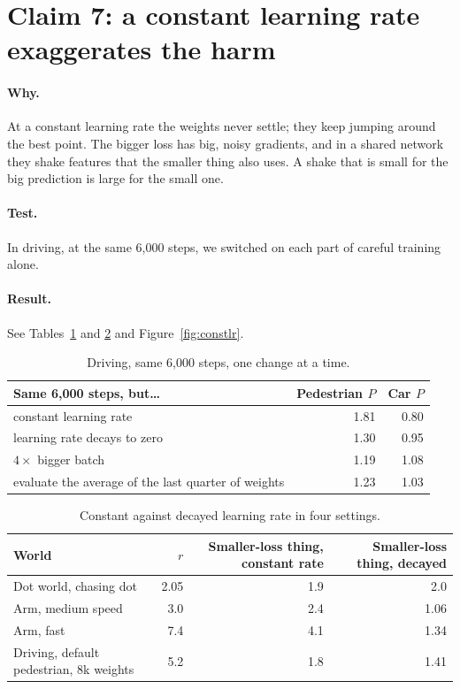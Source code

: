 \documentclass[11pt]{article}
\newcommand{\para}[1]{\paragraph{#1}}
\begin{document}
\section{Claim 7: a constant learning rate exaggerates the harm}
\label{sec:lr}

\para{Why.} At a constant learning rate the weights never settle; they keep jumping around the best point. The bigger loss has big, noisy gradients, and in a shared network they shake features that the smaller thing also uses. A shake that is small for the big prediction is large for the small one.

\para{Test.} In driving, at the same 6,000 steps, we switched on each part of careful training alone.

\para{Result.} See Tables~\ref{tab:lr1} and \ref{tab:lr2} and Figure~\ref{fig:constlr}.

\begin{table}[h]
\centering\small
\caption{Driving, same 6,000 steps, one change at a time.}
\label{tab:lr1}
\begin{tabular}{@{}lrr@{}}
\toprule
Same 6,000 steps, but\ldots & Pedestrian $P$ & Car $P$ \\
\midrule
constant learning rate & 1.81 & 0.80 \\
learning rate decays to zero & 1.30 & 0.95 \\
$4\times$ bigger batch & 1.19 & 1.08 \\
evaluate the average of the last quarter of weights & 1.23 & 1.03 \\
\bottomrule
\end{tabular}
\end{table}

\begin{table}[h]
\centering\small
\caption{Constant against decayed learning rate in four settings.}
\label{tab:lr2}
\setlength{\tabcolsep}{4pt}
\begin{tabular}{@{}lrrr@{}}
\toprule
World & $r$ & Smaller-loss thing, constant rate & Smaller-loss thing, decayed \\
\midrule
Dot world, chasing dot & 2.05 & 1.9 & 2.0 \\
Arm, medium speed & 3.0 & 2.4 & 1.06 \\
Arm, fast & 7.4 & 4.1 & 1.34 \\
Driving, default pedestrian, 8k weights & 5.2 & 1.8 & 1.41 \\
\bottomrule
\end{tabular}
\end{table}
\end{document}
